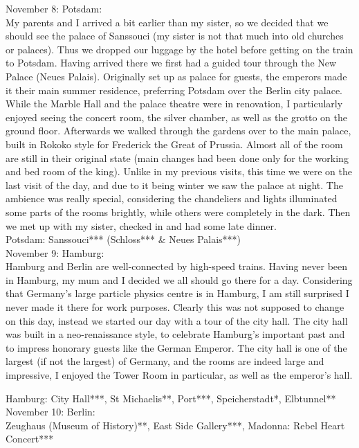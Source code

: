 November 8: Potsdam:\\
My parents and I arrived a bit earlier than my sister, so we decided that we should see the palace of Sanssouci (my sister is not that much into old churches or palaces). Thus we dropped our luggage by the hotel before getting on the train to Potsdam. Having arrived there we first had a guided tour through the New Palace (Neues Palais). Originally set up as palace for guests, the emperors made it their main summer residence, preferring Potsdam over the Berlin city palace. While the Marble Hall and the palace theatre were in renovation, I particularly enjoyed seeing the concert room, the silver chamber, as well as the grotto on the ground floor. Afterwards we walked through the gardens over to the main palace, built in Rokoko style for Frederick the Great of Prussia. Almost all of the room are still in their original state (main changes had been done only for the working and bed room of the king). Unlike in my previous visits, this time we were on the last visit of the day, and due to it being winter we saw the palace at night. The ambience was really special, considering the chandeliers and lights illuminated some parts of the rooms brightly, while others were completely in the dark. Then we met up with my sister, checked in and had some late dinner.\\

Potsdam: Sanssouci*** (Schloss*** \& Neues Palais***)\\

November 9: Hamburg:\\
Hamburg and Berlin are well-connected by high-speed trains. Having never been in Hamburg, my mum and I decided we all should go there for a day. Considering that Germany's large particle physics centre is in Hamburg, I am still surprised I never made it there for work purposes. Clearly this was not supposed to change on this day, instead we started our day with a tour of the city hall. The city hall was built in a neo-renaissance style, to celebrate Hamburg's important past and to impress honorary guests like the German Emperor. The city hall is one of the largest (if not the largest) of Germany, and the rooms are indeed large and impressive, I enjoyed the Tower Room in particular, as well as the emperor's hall. 

Hamburg: City Hall***, St Michaelis**, Port***, Speicherstadt*, Elbtunnel**\\

November 10: Berlin:\\
Zeughaus (Museum of History)**, East Side Gallery***, Madonna: Rebel Heart Concert***\\

